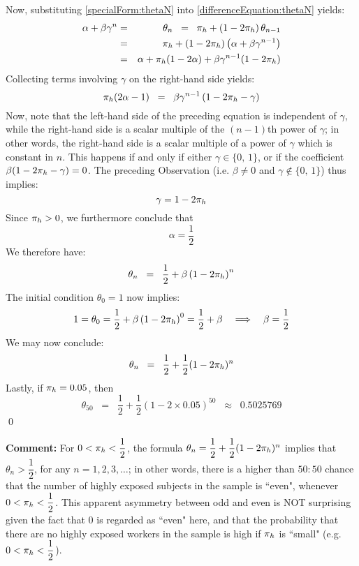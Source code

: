 \vskip 0.5cm
\noindent
Now, substituting \eqref{specialForm:thetaN} into \eqref{differenceEquation:thetaN} yields:
\begin{eqnarray*}
\alpha + \beta\gamma^{n}
& = & \theta_{n} \;\; = \;\; \pi_{h} + (1 - 2\pi_{h})\,\theta_{n-1} \\
& = & \pi_{h} + (1 - 2\pi_{h})\left(\alpha + \beta\gamma^{n-1}\right) \\
& = & \alpha + \pi_{h}(1 - 2\alpha) + \beta\gamma^{n-1}(1 - 2\pi_{h})
\end{eqnarray*}
Collecting terms involving $\gamma$ on the right-hand side yields:
\begin{equation*}
\pi_{h}(2\alpha - 1)
\;\; = \;\;
\beta\gamma^{n-1}\left(1 - 2\pi_{h} - \gamma\right)
\end{equation*}
Now, note that the left-hand side of the preceding equation is independent of $\gamma$,
while the right-hand side is a scalar multiple of the $(n-1)$th power of $\gamma$;
in other words, the right-hand side is a scalar multiple of a power of $\gamma$ which
is constant in $n$.
This happens if and only if either $\gamma \in \{0,\,1\}$, or if the coefficient
$\beta(1 - 2\pi_{h} - \gamma) = 0$.
The preceding Observation (i.e. $\beta\neq 0$ and $\gamma \notin \{0,\,1\}$) thus implies:
\begin{equation*}
\gamma = 1 - 2\pi_{h}
\end{equation*}
Since $\pi_{h} > 0$, we furthermore conclude that
\begin{equation*}
\alpha = \dfrac{1}{2}
\end{equation*}
We therefore have:
\begin{equation*}
\theta_{n}
\;\; = \;\;
\dfrac{1}{2} + \beta\left(1 - 2\pi_{h}\right)^{n}
\end{equation*}
The initial condition $\theta_{0} = 1$ now implies:
\begin{equation*}
1 = \theta_{0} = \dfrac{1}{2} + \beta\left(1 - 2\pi_{h}\right)^{0} = \dfrac{1}{2} + \beta
\quad\Longrightarrow\quad
\beta = \dfrac{1}{2}
\end{equation*}
We may now conclude:
\begin{equation*}
\theta_{n} \;\; = \;\;
\dfrac{1}{2} + \dfrac{1}{2}(1 - 2\pi_{h})^{n}
\end{equation*}
Lastly, if $\pi_{h} = 0.05$, then
\begin{equation*}
\theta_{50}
\;\; =       \;\; \dfrac{1}{2} + \dfrac{1}{2}(1 - 2\times 0.05)^{50}
\;\; \approx \;\; 0.5025769
\end{equation*}
\qed

\vskip 1.0cm
\noindent
{\scriptsize\textbf{Comment:}\quad
For $0 < \pi_{h} < \dfrac{1}{2}$, the formula $\theta_{n} = \dfrac{1}{2} + \dfrac{1}{2}(1-2\pi_{h})^{n}$
implies that $\theta_{n} > \dfrac{1}{2}$, for any $n = 1, 2, 3, \ldots$;
in other words, there is a higher than $50:50$ chance that the number of highly exposed subjects
in the sample is ``even", whenever $0 < \pi_{h} < \dfrac{1}{2}$.
This apparent asymmetry between odd and even is NOT surprising given the fact that $0$ is regarded
as ``even" here, and that the probability that there are no highly exposed workers in the sample
is high if $\pi_{h}$ is ``small" (e.g. $0 < \pi_{h} < \dfrac{1}{2}$).
}


